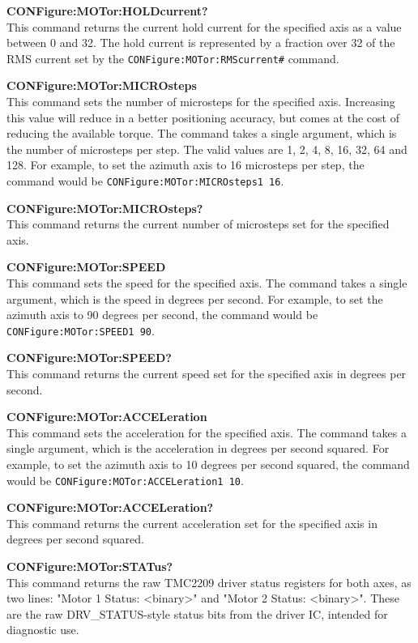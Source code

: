 \textbf{CONFigure:MOTor:HOLDcurrent?} \\
This command returns the current hold current for the specified axis as a value between 0 and 32. The hold current is represented by a fraction over 32 of the RMS current set by the \texttt{CONFigure:MOTor:RMScurrent\#} command.

\textbf{CONFigure:MOTor:MICROsteps} \\
This command sets the number of microsteps for the specified axis. Increasing this value will reduce in a better positioning accuracy, but comes at the cost of reducing the available torque. The command takes a single argument, which is the number of microsteps per step. The valid values are 1, 2, 4, 8, 16, 32, 64 and 128. For example, to set the azimuth axis to 16 microsteps per step, the command would be \texttt{CONFigure:MOTor:MICROsteps1 16}.

\textbf{CONFigure:MOTor:MICROsteps?} \\
This command returns the current number of microsteps set for the specified axis. 

\textbf{CONFigure:MOTor:SPEED} \\
This command sets the speed for the specified axis. The command takes a single argument, which is the speed in degrees per second. For example, to set the azimuth axis to 90 degrees per second, the command would be \texttt{CONFigure:MOTor:SPEED1 90}.

\textbf{CONFigure:MOTor:SPEED?} \\
This command returns the current speed set for the specified axis in degrees per second.

\textbf{CONFigure:MOTor:ACCELeration} \\
This command sets the acceleration for the specified axis. The command takes a single argument, which is the acceleration in degrees per second squared. For example, to set the azimuth axis to 10 degrees per second squared, the command would be \texttt{CONFigure:MOTor:ACCELeration1 10}.

\textbf{CONFigure:MOTor:ACCELeration?} \\
This command returns the current acceleration set for the specified axis in degrees per second squared.

\textbf{CONFigure:MOTor:STATus?} \\
This command returns the raw TMC2209 driver status registers for both axes, as two lines: "Motor 1 Status: <binary>" and "Motor 2 Status: <binary>". These are the raw DRV\_STATUS-style status bits from the driver IC, intended for diagnostic use.

